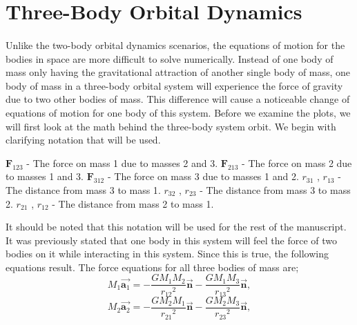 \documentclass[]{article}
\begin{document}
\section{Three-Body Orbital Dynamics}
\begin{multicols}{2}
\paragraph{}
\setlength{\parskip}{1em}
Unlike the two-body orbital dynamics scenarios, the equations of motion for the bodies in space are more difficult to solve numerically. Instead of one body of mass only having the gravitational attraction of another single body of mass, one body of mass in a three-body orbital system will experience the force of gravity due to two other bodies of mass. This difference will cause a noticeable change of equations of motion for one body of this system. Before we examine the plots, we will first look at the math behind the three-body system orbit. We begin with clarifying notation that will be used.
\begin{center}
$\textbf{F}_{123}$ - \small{The force on mass 1 due to masses 2 and 3}.\newline
$\textbf{F}_{213}$ - \small{The force on mass 2 due to masses 1 and 3}.\newline
$\textbf{F}_{312}$ - \small{The force on mass 3 due to masses 1 and 2}.\newline
$r_{31}$ , $r_{13}$ - \small{The distance from mass 3 to mass 1}.\newline
$r_{32}$ , $r_{23}$ - \small{The distance from mass 3 to mass 2}.\newline
$r_{21}$ , $r_{12}$ - \small{The distance from mass 2 to mass 1}.\newline
\end{center}
It should be noted that this notation will be used for the rest of the manuscript. It was previously stated that one body in this system will feel the force of two bodies on it while interacting in this system. Since this is true, the following equations result. The force equations for all three bodies of mass are;
\begin{equation}\label{13}
M_1 \Vec{\textbf{a}_1}=-\frac{GM_1M_2}{{r_{12}}^2}{\Vec{\textbf{n}}}-\frac{GM_1M_3}{{r_{13}}^2}{\Vec{\textbf{n}}},
\end{equation}
\begin{equation}\label{14}
M_2 \Vec{\textbf{a}_2}=-\frac{GM_2M_1}{{r_{21}}^2}{\Vec{\textbf{n}}}-\frac{GM_2M_3}{{r_{23}}^2}{\Vec{\textbf{n}}},

\end{equation}
\end{multicols}
\end{document}
